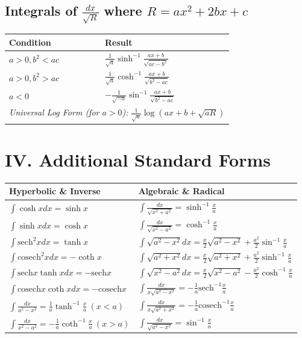 \documentclass[11pt, a4paper]{article}
\begin{document}
\subsection*{\color{secondary} Integrals of $\frac{dx}{\sqrt{R}}$ where $R = ax^2+2bx+c$}
\begin{center}
\begin{tabular}{@{}p{} p{}@{}}
\toprule
\textbf{Condition} & \textbf{Result} \\
\midrule
$a > 0, b^2 < ac$ & $\frac{1}{\sqrt{a}} \sinh^{-1} \frac{ax+b}{\sqrt{ac-b^2}}$ \\
$a > 0, b^2 > ac$ & $\frac{1}{\sqrt{a}} \cosh^{-1} \frac{ax+b}{\sqrt{b^2-ac}}$ \\
$a < 0$ & $-\frac{1}{\sqrt{-a}} \sin^{-1} \frac{ax+b}{\sqrt{b^2-ac}}$ \\
\multicolumn{2}{c}{\textit{Universal Log Form (for $a>0$): } $\frac{1}{\sqrt{a}} \log(ax+b+\sqrt{aR})$} \\
\bottomrule
\end{tabular}
\end{center}

\vspace{0.3cm}

\section*{\color{primary} IV. Additional Standard Forms}

\begin{center}
\begin{tabular}{@{}p{} p{}@{}}
\toprule
\textbf{Hyperbolic \& Inverse} & \textbf{Algebraic \& Radical} \\
\midrule
$\int \cosh x dx = \sinh x$ & $\int \frac{dx}{\sqrt{x^2+a^2}} = \sinh^{-1}\frac{x}{a}$ \\
$\int \sinh x dx = \cosh x$ & $\int \frac{dx}{\sqrt{x^2-a^2}} = \cosh^{-1}\frac{x}{a}$ \\
$\int \text{sech}^2 x dx = \tanh x$ & $\int \sqrt{a^2-x^2} dx = \frac{x}{2}\sqrt{a^2-x^2} + \frac{a^2}{2}\sin^{-1}\frac{x}{a}$ \\
$\int \text{cosech}^2 x dx = -\coth x$ & $\int \sqrt{a^2+x^2} dx = \frac{x}{2}\sqrt{a^2+x^2} + \frac{a^2}{2}\sinh^{-1}\frac{x}{a}$ \\
$\int \text{sech} x \tanh x dx = -\text{sech} x$ & $\int \sqrt{x^2-a^2} dx = \frac{x}{2}\sqrt{x^2-a^2} - \frac{a^2}{2}\cosh^{-1}\frac{x}{a}$ \\
$\int \text{cosech} x \coth x dx = -\text{cosech} x$ & $\int \frac{dx}{x\sqrt{a^2-x^2}} = -\frac{1}{a}\text{sech}^{-1}\frac{x}{a}$ \\
$\int \frac{dx}{a^2-x^2} = \frac{1}{a}\tanh^{-1}\frac{x}{a} \ (x<a)$ & $\int \frac{dx}{x\sqrt{a^2+x^2}} = -\frac{1}{a}\text{cosech}^{-1}\frac{x}{a}$ \\
$\int \frac{dx}{x^2-a^2} = -\frac{1}{a}\coth^{-1}\frac{x}{a} \ (x>a)$ & $\int \frac{dx}{\sqrt{a^2-x^2}} = \sin^{-1}\frac{x}{a}$ \\
\bottomrule
\end{tabular}
\end{center}
\end{document}
